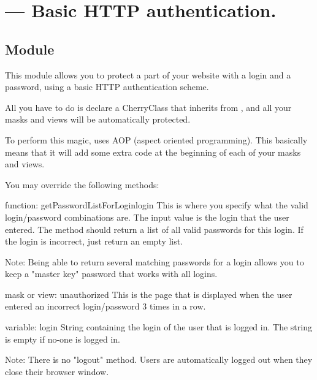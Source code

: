 \section{ --- Basic HTTP authentication.}

\subsection{Module}
This module allows you to protect a part of your website with a login and a password, using a basic
HTTP authentication scheme.

All you have to do is declare a CherryClass that inherits from , and all your masks
and views will be automatically protected.

To perform this magic,  uses AOP (aspect oriented programming). This basically means
that it will add some extra code at the beginning of each of your masks and views.

You may override the following methods:

\begin{funcdesc}{function: getPasswordListForLogin}{login}
This is where you specify what the valid login/password combinations are. The input value is the login that the
user entered. The method should return a list of all valid passwords for this login. If the login is incorrect, just
return an empty list.

Note: Being able to return several matching passwords for a login allows you to keep a "master key" password that works 
with all logins.
\end{funcdesc}

\begin{funcdesc}{mask or view: unauthorized}{}
This is the page that is displayed when the user entered an incorrect login/password 3 times in a row.
\end{funcdesc}

\begin{memberdesc}{variable: login}
String containing the login of the user that is logged in. The string is empty if no-one is logged in.
\end{memberdesc}

Note: There is no "logout" method. Users are automatically logged out when they close their browser window.

\begin{seealso}
\end{seealso}

